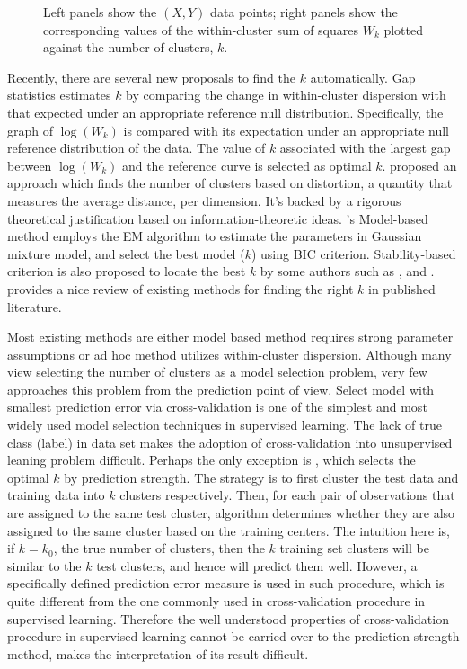 \documentclass[11pt]{article}
\begin{document}
\begin{figure}
\begin{minipage}{\linewidth}
\begin{minipage}{0.45\linewidth}
  \end{minipage}
\end{minipage}
\caption{Left panels show the $(X,Y)$ data points; right panels
  show the corresponding values of the within-cluster sum of squares $W_k$
plotted against the number of clusters, $k$.}
\label{fig:elbow}
\end{figure}


Recently, there are several new proposals to find the $k$ automatically. Gap
statistics \citep{tibshirani2001estimating} estimates $k$ by comparing the
change in within-cluster dispersion with that expected under an appropriate
reference null distribution. Specifically, the graph of $\log(W_k)$ is
compared with its expectation under an appropriate null reference distribution
of the data. The value of $k$ associated with the largest gap between
$\log(W_k)$ and the reference curve is selected as optimal $k$.
\citet{sugar2003finding} proposed an approach which finds the number of
clusters based on distortion, a quantity that measures the average distance,
per dimension. It's backed by a rigorous theoretical justification based on
information-theoretic ideas.   \citet{fraley2002model}'s Model-based method
employs the EM algorithm to estimate the parameters in Gaussian mixture model,
and select the best model ($k$) using BIC criterion. Stability-based criterion
is also proposed to locate the best $k$ by some authors such as
\citet{ben2001stability}, \citet{wang2010consistent} and
\citet{fang2012selection}. \citet{chiang2010intelligent} provides a nice review
of existing methods for finding the right $k$ in published literature.


Most existing methods are either model based method requires strong parameter
assumptions or ad hoc method utilizes within-cluster dispersion. Although many
view selecting the number of clusters as a model selection problem, very few
approaches this problem from the prediction point of view. Select model with
smallest prediction error via cross-validation is one of the simplest and most
widely used model selection techniques in supervised learning. The lack of
true class (label) in data set makes the adoption of cross-validation into
unsupervised leaning problem difficult. Perhaps the only exception is
\cite{tibshirani2005cluster}, which selects the optimal $k$ by prediction
strength. The strategy is to first cluster the test data and training data
into $k$ clusters respectively. Then, for each pair of observations that are
assigned to the same test cluster, algorithm determines whether they are also
assigned to the same cluster based on the training centers. The intuition here
is, if $k=k_0$, the true number of clusters, then the $k$ training set
clusters will be similar to the $k$ test clusters, and hence will predict them
well. However, a specifically defined prediction error measure is used in such
procedure, which is quite different from the one commonly used in
cross-validation procedure in supervised learning. Therefore the well
understood properties of cross-validation procedure in supervised learning
cannot be carried over to the prediction strength method, makes the
interpretation of its result difficult.
\end{document}
